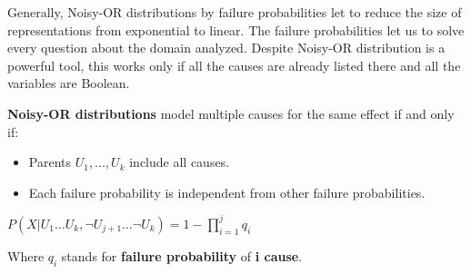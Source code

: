 Generally, Noisy-OR distributions by failure probabilities let to reduce the size of representations from exponential to linear. The failure probabilities let us
to solve every question about the domain analyzed. Despite Noisy-OR distribution is a powerful tool, this works only if all the causes are already listed there and all the variables
are Boolean.
\begin{definition}
    \textbf{Noisy-OR distributions} model multiple causes for the same effect if and only if:
    \begin{itemize}
        \renewcommand{\labelitemi}{-}
        \item Parents $U_1, \dots, U_k$ include all causes.
        \item Each failure probability is independent from other failure probabilities.
    \end{itemize} \vspace{7pt}

    \begin{center}
        $P(X|U_1 \dots U_k, \neg U_{j+1} \dots \neg U_k) = 1 - \prod_{i=1}^{j} q_i$
    \end{center} \vspace{3.5pt}

    Where $q_i$ stands for \textbf{failure probability} of \textbf{i cause}.
\end{definition}
